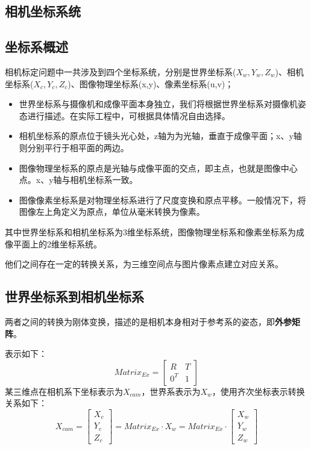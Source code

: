 \documentclass[UTF8]{ctexart}
\begin{document}
\begin{CJK*}{UTF8}{gbsn}
\section{相机坐标系统}
\subsection{坐标系概述}
相机标定问题中一共涉及到四个坐标系统，分别是世界坐标系($X_w,Y_w,Z_w$)、相机坐标系($X_c,Y_c,Z_c$)、图像物理坐标系(x,y)、像素坐标系(u,v)；

\begin{itemize}
    \item 世界坐标系与摄像机和成像平面本身独立，我们将根据世界坐标系对摄像机姿态进行描述。在实际工程中，可根据具体情况自由选择。
    \item 相机坐标系的原点位于镜头光心处，z轴为为光轴，垂直于成像平面；x、y轴则分别平行于相平面的两边。
    \item 图像物理坐标系的原点是光轴与成像平面的交点，即主点，也就是图像中心点。x、y轴与相机坐标系一致。
    \item 图像像素坐标系是对物理坐标系进行了尺度变换和原点平移。一般情况下，将图像左上角定义为原点，单位从毫米转换为像素。　
\end{itemize}

其中世界坐标系和相机坐标系为3维坐标系统，图像物理坐标系和像素坐标系为成像平面上的2维坐标系统。

他们之间存在一定的转换关系，为三维空间点与图片像素点建立对应关系。
\subsection{世界坐标系到相机坐标系}
两者之间的转换为刚体变换，描述的是相机本身相对于参考系的姿态，即\textbf{外参矩阵}。

表示如下：
\[Matrix_{Ex} = \begin{bmatrix}
R & T \\
0^{T} & 1
\end{bmatrix}\]
某三维点在相机系下坐标表示为$X_{cam}$，世界系表示为$X_{w}$，使用齐次坐标表示转换关系如下：
\begin{equation}
\label{ex}
X_{cam} = \begin{bmatrix} X_c \\ Y_c \\ Z_c\end{bmatrix}
= Matrix_{Ex} \cdot X_w= Matrix_{Ex} \cdot\begin{bmatrix}X_w \\ Y_w \\ Z_w\end{bmatrix}
\end{equation}


\end{CJK*}
\end{document}

